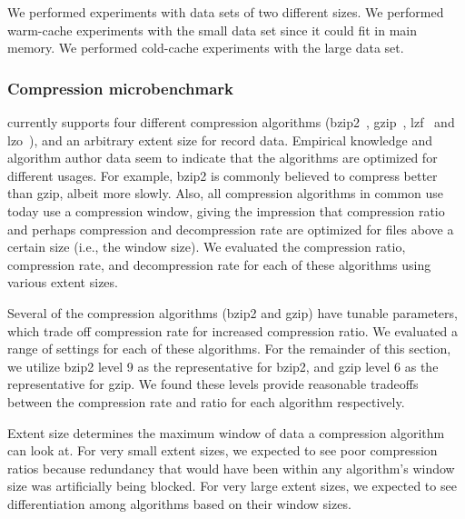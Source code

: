 We performed experiments with data sets of two different sizes.  We
performed warm-cache experiments with the small data set since it
could fit in main memory.  We performed cold-cache experiments with
the large data set.


\subsubsection{Compression microbenchmark}

\DataSeries{} currently supports four different compression algorithms
(bzip2~\cite{BZIP}, gzip~\cite{GZIP}, lzf~\cite{LZF} and lzo~\cite{LZO}),
and an arbitrary extent size for record data.  Empirical knowledge and
algorithm author data seem to indicate that the algorithms are
optimized for different usages.  For example, bzip2 is commonly
believed to compress better than gzip, albeit more slowly.  Also,
all compression algorithms in common use today use a compression
window, giving the impression that compression ratio and perhaps
compression and decompression rate are optimized for files above a
certain size (i.e., the window size).  
We evaluated the compression ratio, compression rate, 
and decompression rate for each of these algorithms
using various extent sizes.

Several of the compression algorithms (bzip2 and gzip)
have tunable parameters, which trade 
off compression rate for increased compression ratio.
We evaluated a range of settings for each of these algorithms.  
For the remainder of this section, we utilize bzip2 level 9 as
the representative for bzip2, and gzip level 6 as the representative
for gzip.  We found these levels provide reasonable tradeoffs
between the compression rate and ratio for each algorithm respectively.

Extent size determines the maximum window of data a compression
algorithm can look at.  For very small extent sizes, we expected to
see poor compression ratios because redundancy that would have been
within any algorithm's window size was artificially being blocked.
For very large extent sizes, we expected to see differentiation among
algorithms based on their window sizes.

